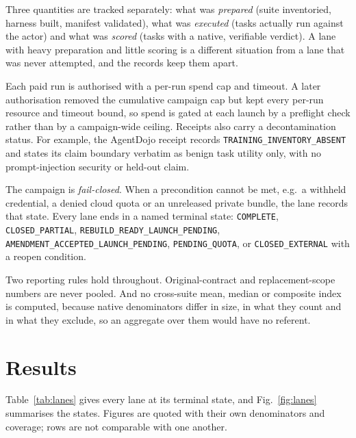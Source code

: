 \documentclass[runningheads]{llncs}
\begin{document}
Three quantities are tracked separately: what was \emph{prepared} (suite
inventoried, harness built, manifest validated), what was \emph{executed}
(tasks actually run against the actor) and what was \emph{scored} (tasks with a
native, verifiable verdict). A lane with heavy preparation and little scoring
is a different situation from a lane that was never attempted, and the records
keep them apart.

Each paid run is authorised with a per-run spend cap and timeout. A later
authorisation removed the cumulative campaign cap but kept every per-run
resource and timeout bound, so spend is gated at each launch by a preflight
check rather than by a campaign-wide ceiling. Receipts also carry a
decontamination status. For example, the AgentDojo receipt records
\texttt{TRAINING\_INVENTORY\_ABSENT} and states its claim boundary verbatim as
benign task utility only, with no prompt-injection security or held-out claim.

The campaign is \emph{fail-closed}. When a precondition cannot be met, e.g.\ a
withheld credential, a denied cloud quota or an unreleased private bundle, the
lane records that state. Every lane ends in a named terminal state:
\texttt{COMPLETE}, \texttt{CLOSED\_PARTIAL},
\texttt{REBUILD\_READY\_LAUNCH\_PENDING},
\texttt{AMENDMENT\_ACCEPTED\_LAUNCH\_PENDING}, \texttt{PENDING\_QUOTA}, or
\texttt{CLOSED\_EXTERNAL} with a reopen condition.

Two reporting rules hold throughout. Original-contract and replacement-scope
numbers are never pooled. And no cross-suite mean, median or composite index is
computed, because native denominators differ in size, in what they count and in
what they exclude, so an aggregate over them would have no referent.

\section{Results}

Table~\ref{tab:lanes} gives every lane at its terminal state, and
Fig.~\ref{fig:lanes} summarises the states. Figures are quoted with their own
denominators and coverage; rows are not comparable with one another.
\end{document}
